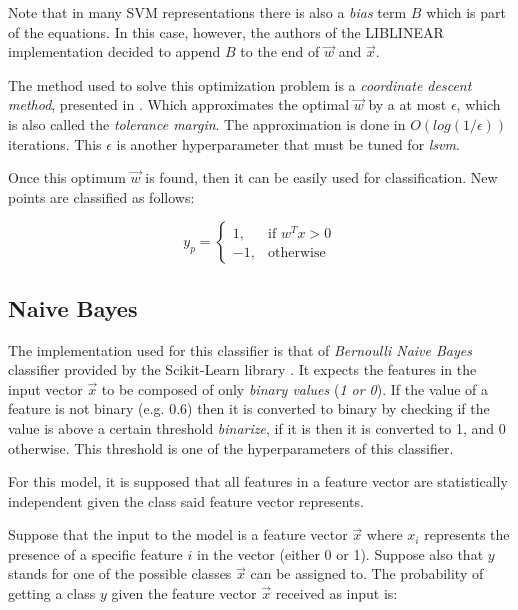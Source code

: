 \documentclass[epsfig,a4paper,11pt,titlepage,twoside,openany]{book}
\begin{document}
Note that in many SVM representations there is also a \textit{bias} term $B$ which is part of the equations. In this case, however, the authors of the LIBLINEAR implementation decided to append $B$ to the end of $\vec{w}$ and $\vec{x}$.

The method used to solve this optimization problem is a \textit{coordinate descent method}, presented in \cite{Hsieh:2008_lsvm_coordinated_descent}. Which approximates the optimal $\vec{w}$ by a at most $\epsilon$, which is also called the \textit{tolerance margin}. The approximation is done in $O(log(1/\epsilon))$ iterations. This $\epsilon$ is another hyperparameter that must be tuned for \textit{lsvm}.

Once this optimum $\vec{w}$ is found, then it can be easily used for classification. New points are classified as follows:

\begin{equation*}
    y_p = \begin{cases}
            1, & \text{if } w^Tx > 0 \\
            -1, & \text{otherwise}
          \end{cases} 
\end{equation*}


\subsection{Naive Bayes}
\label{sec:clf-nb}

The implementation used for this classifier is that of \textit{Bernoulli Naive Bayes} \cite{McCallum98acomparison_bayes, Metsis06spamfiltering_bayes} classifier provided by the Scikit-Learn library \cite{scikit-learn}. It expects the features in the input vector $\vec{x}$ to be composed of only \textit{binary values} (\textit{1 or 0}). If the value of a feature is not binary (e.g. 0.6) then it is converted to binary by checking if the value is above a certain threshold \textit{binarize}, if it is then it is converted to 1, and 0 otherwise. This threshold is one of the hyperparameters of this classifier. 

For this model, it is supposed that all features in a feature vector are statistically independent \cite{McCallum98acomparison_bayes} given the class said feature vector represents. 

Suppose that the input to the model is a feature vector $\vec{x}$ where $x_i$ represents the presence of a specific feature $i$ in the vector (either 0 or 1). Suppose also that $y$ stands for one of the possible classes $\vec{x}$ can be assigned to. The probability of getting a class $y$ given the feature vector $\vec{x}$ received as input is:
\end{document}

